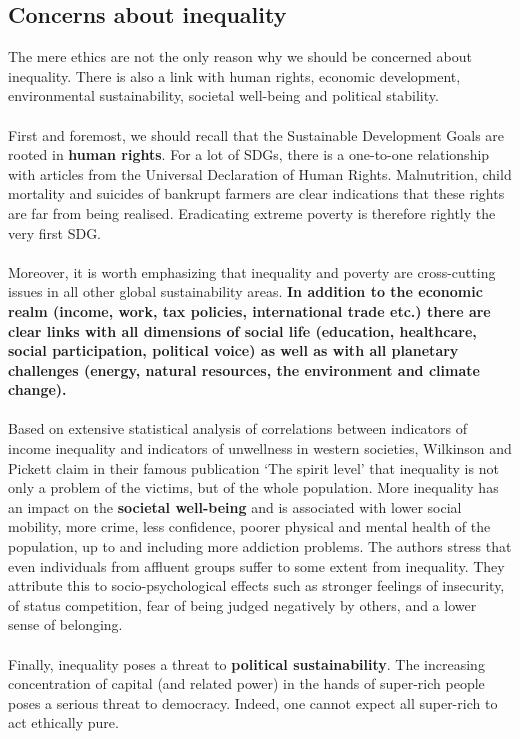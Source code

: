 \documentclass[../summary.tex]{subfiles}
\begin{document}
	\subsection{Concerns about inequality}
	
	The mere ethics are not the only reason why we should be concerned about inequality. There is also a link with human rights, economic development, environmental sustainability, societal well-being and political stability.
	\\\\
	First and foremost, we should recall that the Sustainable Development Goals are rooted in \textbf{human rights}. For a lot of SDGs, there is a one-to-one relationship with articles from the Universal Declaration of Human Rights. Malnutrition, child mortality and suicides of bankrupt farmers are clear indications that these rights are far from being realised. Eradicating extreme poverty is therefore rightly the very first SDG.
	\\\\
	Moreover, it is worth emphasizing that inequality and poverty are cross-cutting issues in all other global sustainability areas. \textbf{In addition to the economic realm (income, work, tax policies, international trade etc.) there are clear links with all dimensions of social life (education, healthcare, social participation, political voice) as well as with all planetary challenges (energy, natural resources, the environment and climate change).}
	\\\\
	Based on extensive statistical analysis of correlations between indicators of income inequality and indicators of unwellness in western societies, Wilkinson and Pickett claim in their famous publication `The spirit level' that inequality is not only a problem of the victims, but of the whole population. More inequality has an impact on the \textbf{societal well-being} and is associated with lower social mobility, more crime, less confidence, poorer physical and mental health of the population, up to and including more addiction problems. The authors stress that even individuals from affluent groups suffer to some extent from inequality. They attribute this to socio-psychological effects such as stronger feelings of insecurity, of status competition, fear of being judged negatively by others, and a lower sense of belonging.
	\\\\
	Finally, inequality poses a threat to \textbf{political sustainability}. The increasing concentration of capital (and related power) in the hands of super-rich people poses a serious threat to democracy. Indeed, one cannot expect all super-rich to act ethically pure.
	
\end{document}
